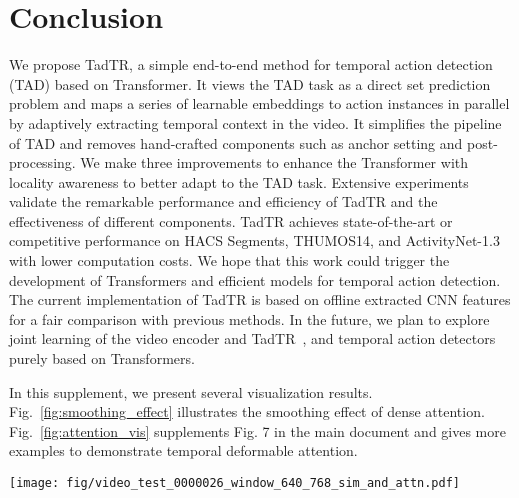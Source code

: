 \documentclass[lettersize,journal]{IEEEtran}
\begin{document}
{\section{Conclusion}
We propose TadTR, a simple end-to-end method for temporal action detection (TAD) based on Transformer. It views the TAD task as a direct set prediction problem and maps a series of learnable embeddings to action instances in parallel by adaptively extracting temporal context in the video.
It simplifies the pipeline of TAD and removes hand-crafted components such as anchor setting and post-processing. We make three improvements to enhance the Transformer with locality awareness to better adapt to the TAD task.
Extensive experiments validate the remarkable performance and efficiency of TadTR and the effectiveness of different components. TadTR achieves state-of-the-art or competitive performance on HACS Segments, THUMOS14, and ActivityNet-1.3 with lower computation costs. 
We hope that this work could trigger the development of Transformers and efficient models for temporal action detection.
The current implementation of TadTR is based on offline extracted CNN features for a fair comparison with previous methods. In the future, we plan to explore joint learning of the video encoder and TadTR~\cite{Liu_2022_CVPR}, and temporal action detectors purely based on Transformers.   

\appendix
In this supplement, we present several visualization results. Fig.~\ref{fig:smoothing_effect} illustrates the smoothing effect of dense attention. Fig.~\ref{fig:attention_vis} supplements Fig. 7 in the main document and gives more examples to demonstrate temporal deformable attention.


\begin{figure*}[!h]
    \centering
    \texttt{[image: fig/video\_test\_0000026\_window\_640\_768\_sim\_and\_attn.pdf]}
    \caption{Different frames in a video is usually highly similar. The dense attention tends to cast uniform attention to different locations in the input sequence at initialization. Left: The similarity matrix of each pair of snippets in CNN features of a randomly selected video. Middle: The attention weight. Right: The similarity matrix of the output feature of the dense-attention. Best viewed in color.}
    \label{fig:smoothing_effect}
\end{figure*}

\begin{figure*}[!b]
\centering
{}


\end{figure*}}
\end{document}
